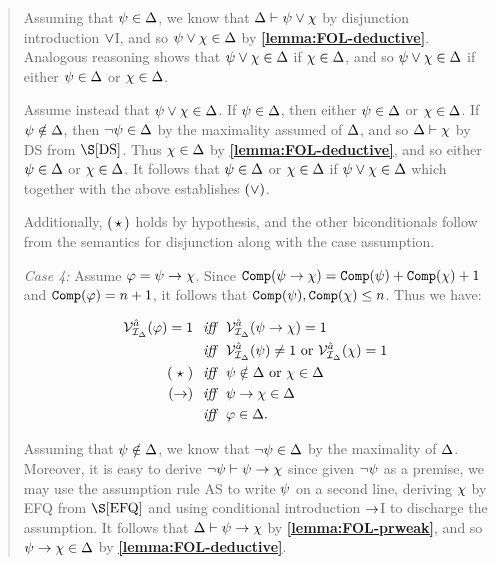 \begin{quote}
  Assuming that $\psi\in\Delta$, we know that $\Delta\vdash\psi\vee\chi$ by disjunction introduction $\vee$I, and so $\psi\vee\chi\in\Delta$ by \textbf{\ref{lemma:FOL-deductive}}.
  Analogous reasoning shows that $\psi\vee\chi\in\Delta$ if $\chi\in\Delta$, and so $\psi\vee\chi\in\Delta$ if either $\psi\in\Delta$ or $\chi\in\Delta$. 

  Assume instead that $\psi\vee\chi\in\Delta$.
  If $\psi\in\Delta$, then either $\psi\in\Delta$ or $\chi\in\Delta$.
  If $\psi\notin\Delta$, then $\neg\psi\in\Delta$ by the maximality assumed of $\Delta$, and so $\Delta\vdash\chi$ by DS from $\S\ref{DS}$.
  Thus $\chi\in\Delta$ by \textbf{\ref{lemma:FOL-deductive}}, and so either $\psi\in\Delta$ or $\chi\in\Delta$. 
  It follows that $\psi\in\Delta$ or $\chi\in\Delta$ if $\psi\vee\chi\in\Delta$ which together with the above establishes $(\vee)$.  

  Additionally, $(\hspace{1.6pt}\star\hspace{1.6pt})$ holds by hypothesis, and the other biconditionals follow from the semantics for disjunction along with the case assumption.

  \textit{Case 4:}
  Assume $\varphi=\psi\rightarrow\chi$.
  Since $\texttt{Comp}(\psi\rightarrow\chi)=\texttt{Comp}(\psi)+\texttt{Comp}(\chi)+1$ and  $\texttt{Comp}(\varphi)=n+1$, it follows that $\texttt{Comp}(\psi),\texttt{Comp}(\chi)\leq n$.
  Thus we have:

  \vspace{-.2in}
  \begin{align*}
    \mathcal{V}_{\mathcal{I}_{\Delta}}^{\hat{a}}(\varphi)=1 &\textit{ ~iff~ } \mathcal{V}_{\mathcal{I}_{\Delta}}^{\hat{a}}(\psi\rightarrow\chi)=1\\
      &\textit{ ~iff~ } \mathcal{V}_{\mathcal{I}_{\Delta}}^{\hat{a}}(\psi)\neq 1 \text{ or } \mathcal{V}_{\mathcal{I}_{\Delta}}^{\hat{a}}(\chi)=1 \\
      (\hspace{2.9pt}\star\hspace{2.9pt}) &\textit{ ~iff~ } \psi\notin\Delta \text{ or } \chi\in\Delta \\
      (\rightarrow) &\textit{ ~iff~ } \psi\rightarrow\chi\in\Delta \\
      &\textit{ ~iff~ } \varphi\in\Delta.
  \end{align*}

  Assuming that $\psi\notin\Delta$, we know that $\neg\psi\in\Delta$ by the maximality of $\Delta$.
  Moreover, it is easy to derive $\neg\psi\vdash\psi\rightarrow\chi$ since given $\neg\psi$ as a premise, we may use the assumption rule AS to write $\psi$ on a second line, deriving $\chi$ by EFQ from $\S\ref{EFQ}$ and using conditional introduction $\rightarrow$I to discharge the assumption.
  It follows that $\Delta\vdash\psi\rightarrow\chi$ by \textbf{\ref{lemma:FOL-prweak}}, and so $\psi\rightarrow\chi\in\Delta$ by \textbf{\ref{lemma:FOL-deductive}}.


\end{quote}
